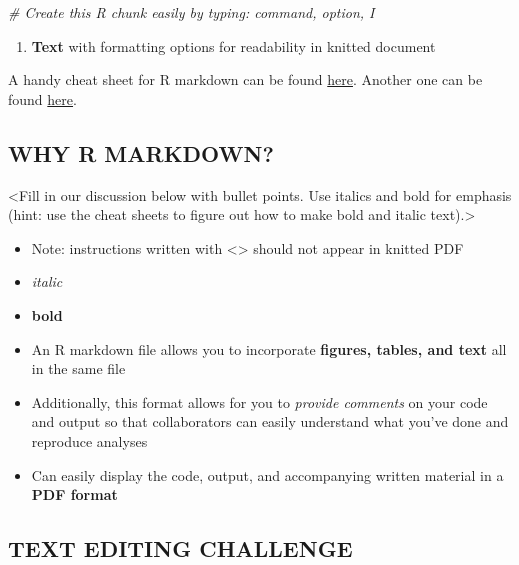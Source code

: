 \documentclass[]{article}
\newenvironment{Shaded}{\begin{snugshade}}{\end{snugshade}}
\newcommand{\CommentTok}[1]{\textcolor[rgb]{0.56,0.35,0.01}{\textit{#1}}}
\providecommand{\tightlist}{%
  \setlength{\itemsep}{0pt}\setlength{\parskip}{0pt}}
\begin{document}
\begin{Shaded}
\begin{Highlighting}[]
\CommentTok{# Create this R chunk easily by typing: command, option, I }
\end{Highlighting}
\end{Shaded}

\begin{enumerate}
\def\labelenumi{\arabic{enumi}.}
\setcounter{enumi}{2}
\tightlist
\item
  \textbf{Text} with formatting options for readability in knitted
  document
\end{enumerate}

A handy cheat sheet for R markdown can be found
\href{https://www.rstudio.com/wp-content/uploads/2015/03/rmarkdown-reference.pdf}{here}.
Another one can be found
\href{https://www.rstudio.com/wp-content/uploads/2015/02/rmarkdown-cheatsheet.pdf}{here}.

\hypertarget{why-r-markdown}{%
\subsection{WHY R MARKDOWN?}\label{why-r-markdown}}

\textless{}Fill in our discussion below with bullet points. Use italics
and bold for emphasis (hint: use the cheat sheets to figure out how to
make bold and italic text).\textgreater{}

\begin{itemize}
\item
  Note: instructions written with \textless{}\textgreater{} should not
  appear in knitted PDF
\item
  \emph{italic}
\item
  \textbf{bold}
\item
  An R markdown file allows you to incorporate \textbf{figures, tables,
  and text} all in the same file
\item
  Additionally, this format allows for you to \emph{provide comments} on
  your code and output so that collaborators can easily understand what
  you've done and reproduce analyses
\item
  Can easily display the code, output, and accompanying written material
  in a \textbf{PDF format}
\end{itemize}

\hypertarget{text-editing-challenge}{%
\subsection{TEXT EDITING CHALLENGE}\label{text-editing-challenge}}
\end{document}
